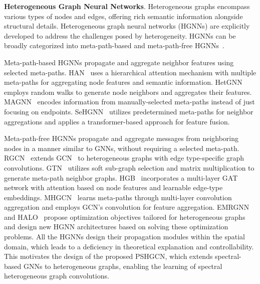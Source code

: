 \documentclass{article}
\begin{document}
\textbf{Heterogeneous Graph Neural Networks}. 
Heterogeneous graphs encompass various types of nodes and edges, offering rich semantic information alongside structural details. Heterogeneous graph neural networks (HGNNs) are explicitly developed to address the challenges posed by heterogeneity. HGNNs can be broadly categorized into meta-path-based and meta-path-free HGNNs~\cite{sehgnn}. 

Meta-path-based HGNNs propagate and aggregate neighbor features using selected meta-paths. HAN~\cite{han} uses a hierarchical attention mechanism with multiple meta-paths for aggregating node features and semantic information. HetGNN~\cite{hetgnn} employs random walks to generate node neighbors and aggregates their features. MAGNN~\cite{magnn} encodes information from manually-selected meta-paths instead of just focusing on endpoints. SeHGNN~\cite{sehgnn} utilizes predetermined meta-paths for neighbor aggregations and applies a transformer-based approach for feature fusion. 

Meta-path-free HGNNs propagate and aggregate messages from neighboring nodes in a manner similar to GNNs, without requiring a selected meta-path. RGCN~\cite{rgcn} extends GCN~\cite{gcn} to heterogeneous graphs with edge type-specific graph convolutions. GTN~\cite{gtn} utilizes soft sub-graph selection and matrix multiplication to generate meta-path neighbor graphs. HGB~\cite{hgb} incorporates a multi-layer GAT network with attention based on node features and learnable edge-type embeddings. MHGCN~\cite{mhgcn} learns meta-paths through multi-layer convolution aggregation and employs GCN's convolution for feature aggregation. EMRGNN~\cite{emrgnn} and HALO~\cite{halo} propose optimization objectives tailored for heterogeneous graphs and design new HGNN architectures based on solving these optimization problems. All the HGNNs design their propagation modules within the spatial domain, which leads to a deficiency in theoretical explanation and controllability. This motivates the design of the proposed PSHGCN, which extends spectral-based GNNs to heterogeneous graphs, enabling the learning of spectral heterogeneous graph convolutions.
\end{document}
